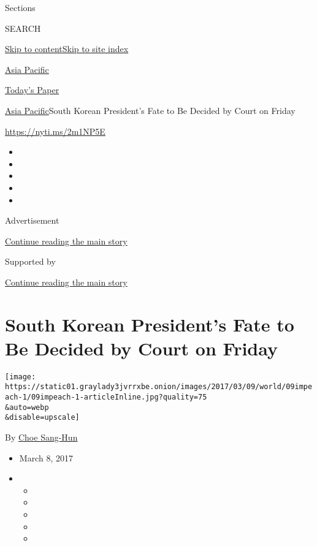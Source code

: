 Sections

SEARCH

\protect\hyperlink{site-content}{Skip to
content}\protect\hyperlink{site-index}{Skip to site index}

\href{https://www.nytimes3xbfgragh.onion/section/world/asia}{Asia
Pacific}

\href{https://myaccount.nytimes3xbfgragh.onion/auth/login?response_type=cookie\&client_id=vi}{}

\href{https://www.nytimes3xbfgragh.onion/section/todayspaper}{Today's
Paper}

\href{/section/world/asia}{Asia Pacific}\textbar{}South Korean
President's Fate to Be Decided by Court on Friday

\url{https://nyti.ms/2m1NP5E}

\begin{itemize}
\item
\item
\item
\item
\item
\end{itemize}

Advertisement

\protect\hyperlink{after-top}{Continue reading the main story}

Supported by

\protect\hyperlink{after-sponsor}{Continue reading the main story}

\hypertarget{south-korean-presidents-fate-to-be-decided-by-court-on-friday}{%
\section{South Korean President's Fate to Be Decided by Court on
Friday}\label{south-korean-presidents-fate-to-be-decided-by-court-on-friday}}

\texttt{[image: https://static01.graylady3jvrrxbe.onion/images/2017/03/09/world/09impeach-1/09impeach-1-articleInline.jpg?quality=75\\\&auto=webp\\\&disable=upscale]}

By \href{http://www.nytimes3xbfgragh.onion/by/choe-sang-hun}{Choe
Sang-Hun}

\begin{itemize}
\item
  March 8, 2017
\item
  \begin{itemize}
  \item
  \item
  \item
  \item
  \item
  \end{itemize}
\end{itemize}

